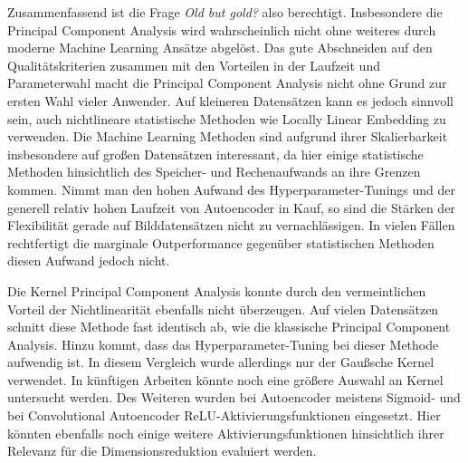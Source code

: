 Zusammenfassend ist die Frage \textit{Old but gold?} also berechtigt. Insbesondere die Principal
Component Analysis wird wahrscheinlich nicht ohne weiteres durch moderne Machine Learning Ansätze
abgelöst. Das gute Abschneiden auf den Qualitätskriterien zusammen mit den Vorteilen in der
Laufzeit und Parameterwahl macht die Principal Component Analysis nicht ohne Grund zur ersten Wahl
vieler Anwender. Auf kleineren Datensätzen kann es jedoch sinnvoll sein, auch nichtlineare
statistische Methoden wie Locally Linear Embedding zu verwenden. Die Machine Learning Methoden sind
aufgrund ihrer Skalierbarkeit insbesondere auf großen Datensätzen interessant, da hier einige
statistische Methoden hinsichtlich des Speicher- und Rechenaufwands an ihre Grenzen kommen. Nimmt
man den hohen Aufwand des Hyperparameter-Tunings und der generell relativ hohen Laufzeit von
Autoencoder in Kauf, so sind die Stärken der Flexibilität gerade auf Bilddatensätzen nicht zu
vernachlässigen. In vielen Fällen rechtfertigt die marginale Outperformance gegenüber statistischen
Methoden diesen Aufwand jedoch nicht.

Die Kernel Principal Component Analysis konnte durch den vermeintlichen Vorteil der Nichtlinearität
ebenfalls nicht überzeugen. Auf vielen Datensätzen schnitt diese Methode fast identisch ab, wie die
klassische Principal Component Analysis. Hinzu kommt, dass das Hyperparameter-Tuning bei dieser
Methode aufwendig ist. In diesem Vergleich wurde allerdings nur der Gaußsche Kernel verwendet. In
künftigen Arbeiten könnte noch eine größere Auswahl an Kernel untersucht werden. Des Weiteren
wurden bei Autoencoder meistens Sigmoid- und bei Convolutional Autoencoder
ReLU-Aktivierungsfunktionen eingesetzt. Hier könnten ebenfalls noch einige weitere
Aktivierungsfunktionen hinsichtlich ihrer Relevanz für die Dimensionsreduktion evaluiert werden.